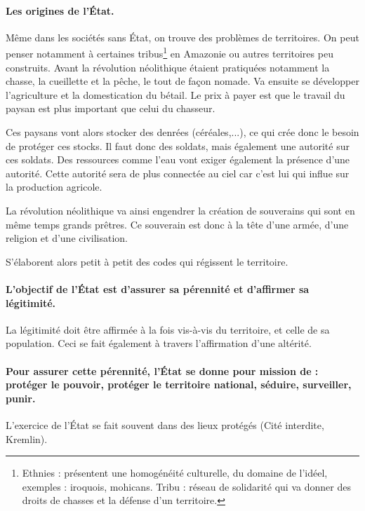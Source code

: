 \documentclass[a4paper,10pt]{article}
\begin{document}
		\paragraph{Les origines de l'État.}

		Même dans les sociétés sans État, on trouve des problèmes de territoires.
		On peut penser notamment à certaines tribus\footnote{
			Ethnies : présentent une homogénéité culturelle, du domaine de l'idéel, exemples : iroquois, mohicans.
			Tribu : réseau de solidarité qui va donner des droits de chasses et la défense d'un territoire.
			}
		en Amazonie ou autres territoires peu construits.
		Avant la révolution néolithique étaient pratiquées notamment la chasse, la cueillette et la pêche, le tout de façon nomade.
		Va ensuite se développer l'agriculture et la domestication du bétail.
		Le prix à payer est que le travail du paysan est plus important que celui du chasseur.

		Ces paysans vont alors stocker des denrées (céréales,...), ce qui crée donc le besoin de protéger ces stocks.
		Il faut donc des soldats, mais également une autorité sur ces soldats.
		Des ressources comme l'eau vont exiger également la présence d'une autorité.
		Cette autorité sera de plus connectée au ciel car c'est lui qui influe sur la production agricole.

		La révolution néolithique va ainsi engendrer la création de souverains qui sont en même temps grands prêtres.
		Ce souverain est donc à la tête d'une armée, d'une religion et d'une civilisation.

		S'élaborent alors petit à petit des codes qui régissent le territoire.

		\paragraph{L'objectif de l'État est d'assurer sa pérennité et d'affirmer sa légitimité.}

		La légitimité doit être affirmée à la fois vis-à-vis du territoire, et celle de sa population.
		Ceci se fait également à travers l'affirmation d'une altérité.

		\paragraph{Pour assurer cette pérennité, l'État se donne pour mission de : protéger le pouvoir, protéger le territoire national, séduire, surveiller, punir.}

		L'exercice de l'État se fait souvent dans des lieux protégés (Cité interdite, Kremlin).
\end{document}
